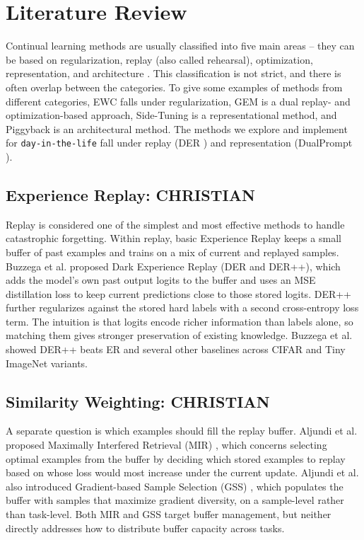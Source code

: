 \documentclass{article}
\begin{document}
\section{Literature Review}
Continual learning methods are usually classified into five main areas -- they can be based on
regularization, replay (also called rehearsal), optimization, representation, and architecture
\cite{cl-overview}. This classification is not strict, and there is often overlap between the categories. To
give some examples of methods from different categories, EWC \cite{ewc} falls under regularization, GEM
\cite{gem} is a dual replay- and optimization-based approach, Side-Tuning \cite{side-tuning} is a
representational method, and Piggyback \cite{piggyback} is an architectural method. The methods we explore
and implement for \texttt{day-in-the-life} fall under replay (DER \cite{der}) and representation (DualPrompt
\cite{dualprompt}).

\subsection{Experience Replay: CHRISTIAN}
Replay is considered one of the simplest and most effective methods to
handle catastrophic forgetting. Within replay, basic Experience Replay keeps a
small buffer of past examples and trains on a mix of current and replayed
samples. Buzzega et al. \cite{der} proposed Dark Experience Replay (DER and
DER++), which adds the model's own past output logits to the buffer and uses an
MSE distillation loss to keep current predictions close to those stored logits.
DER++ further regularizes against the stored hard labels with a second
cross-entropy loss term. The intuition is that logits encode richer information
than labels alone, so matching them gives stronger preservation of existing
knowledge. Buzzega et al. showed DER++ beats ER and several other baselines
across CIFAR and Tiny ImageNet variants.

\subsection{Similarity Weighting: CHRISTIAN}
A separate question is which examples should fill the replay buffer. Aljundi
et al. proposed Maximally Interfered Retrieval (MIR) \cite{mir}, which concerns
selecting optimal examples from the buffer by deciding which stored examples to
replay based on whose loss would most increase under the current update.
Aljundi et al. also introduced Gradient-based Sample Selection (GSS)
\cite{gss}, which populates the buffer with samples that maximize gradient
diversity, on a sample-level rather than task-level. Both MIR and GSS target
buffer management, but neither directly addresses how to distribute buffer capacity
across tasks.
\end{document}
